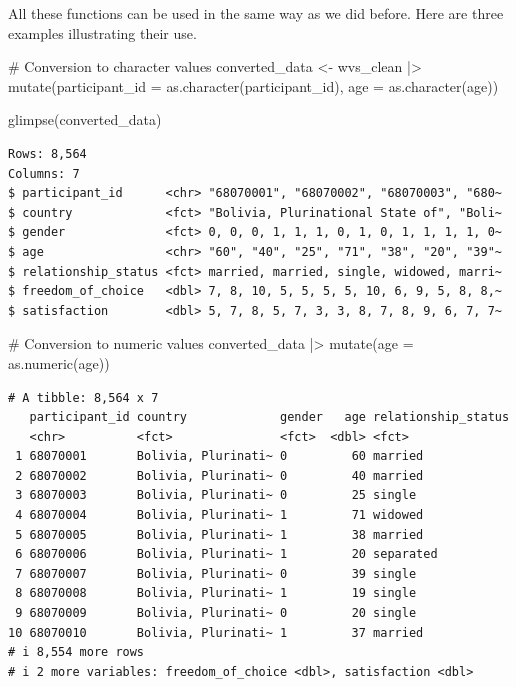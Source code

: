 \documentclass[
  letterpaper,
]{krantz}
\makeatletter
\newenvironment{Shaded}{\begin{snugshade}}{\end{snugshade}}
\newcommand{\AttributeTok}[1]{\textcolor[rgb]{0.40,0.45,0.13}{#1}}
\newcommand{\CommentTok}[1]{\textcolor[rgb]{0.37,0.37,0.37}{#1}}
\newcommand{\FunctionTok}[1]{\textcolor[rgb]{0.28,0.35,0.67}{#1}}
\newcommand{\NormalTok}[1]{\textcolor[rgb]{0.00,0.23,0.31}{#1}}
\newcommand{\OtherTok}[1]{\textcolor[rgb]{0.00,0.23,0.31}{#1}}
\newcommand{\SpecialCharTok}[1]{\textcolor[rgb]{0.37,0.37,0.37}{#1}}
\newenvironment{kframe}{%
\medskip{}
\setlength{\fboxsep}{.8em}
 \def\at@end@of@kframe{}%
 \ifinner\ifhmode%
  \def\at@end@of@kframe{\end{minipage}}%
  \begin{minipage}{\columnwidth}%
 \fi\fi%
 \def\FrameCommand##1{\hskip\@totalleftmargin \hskip-\fboxsep
 \colorbox{shadecolor}{##1}\hskip-\fboxsep
     \hskip-\linewidth \hskip-\@totalleftmargin \hskip\columnwidth}%
 \MakeFramed {\advance\hsize-\width
   \@totalleftmargin\z@ \linewidth\hsize
   \@setminipage}}%
 {\par\unskip\endMakeFramed%
 \at@end@of@kframe}
\renewenvironment{Shaded}{\begin{kframe}}{\end{kframe}}
\makeatother
\begin{document}
All these functions can be used in the same way as we did before. Here
are three examples illustrating their use.

\begin{Shaded}
\begin{Highlighting}[]
\CommentTok{\# Conversion to character values}
\NormalTok{converted\_data }\OtherTok{\textless{}{-}}
\NormalTok{  wvs\_clean }\SpecialCharTok{|\textgreater{}}
  \FunctionTok{mutate}\NormalTok{(}\AttributeTok{participant\_id =} \FunctionTok{as.character}\NormalTok{(participant\_id),}
         \AttributeTok{age =} \FunctionTok{as.character}\NormalTok{(age))}

\FunctionTok{glimpse}\NormalTok{(converted\_data)}
\end{Highlighting}
\end{Shaded}

\begin{verbatim}
Rows: 8,564
Columns: 7
$ participant_id      <chr> "68070001", "68070002", "68070003", "680~
$ country             <fct> "Bolivia, Plurinational State of", "Boli~
$ gender              <fct> 0, 0, 0, 1, 1, 1, 0, 1, 0, 1, 1, 1, 1, 0~
$ age                 <chr> "60", "40", "25", "71", "38", "20", "39"~
$ relationship_status <fct> married, married, single, widowed, marri~
$ freedom_of_choice   <dbl> 7, 8, 10, 5, 5, 5, 5, 10, 6, 9, 5, 8, 8,~
$ satisfaction        <dbl> 5, 7, 8, 5, 7, 3, 3, 8, 7, 8, 9, 6, 7, 7~
\end{verbatim}

\begin{Shaded}
\begin{Highlighting}[]
\CommentTok{\# Conversion to numeric values}
\NormalTok{converted\_data }\SpecialCharTok{|\textgreater{}}
  \FunctionTok{mutate}\NormalTok{(}\AttributeTok{age =} \FunctionTok{as.numeric}\NormalTok{(age))}
\end{Highlighting}
\end{Shaded}

\begin{verbatim}
# A tibble: 8,564 x 7
   participant_id country             gender   age relationship_status
   <chr>          <fct>               <fct>  <dbl> <fct>              
 1 68070001       Bolivia, Plurinati~ 0         60 married            
 2 68070002       Bolivia, Plurinati~ 0         40 married            
 3 68070003       Bolivia, Plurinati~ 0         25 single             
 4 68070004       Bolivia, Plurinati~ 1         71 widowed            
 5 68070005       Bolivia, Plurinati~ 1         38 married            
 6 68070006       Bolivia, Plurinati~ 1         20 separated          
 7 68070007       Bolivia, Plurinati~ 0         39 single             
 8 68070008       Bolivia, Plurinati~ 1         19 single             
 9 68070009       Bolivia, Plurinati~ 0         20 single             
10 68070010       Bolivia, Plurinati~ 1         37 married            
# i 8,554 more rows
# i 2 more variables: freedom_of_choice <dbl>, satisfaction <dbl>
\end{verbatim}
\end{document}
